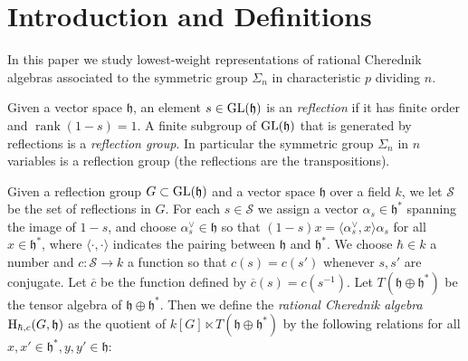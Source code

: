 \documentclass{article}
\numberwithin{equation}{section}
\newcommand{\rank}{\operatorname{rank}}
\newcommand{\h}{\mathfrak{h}}
\newcommand{\GL}{{\rm GL}}
\newcommand{\HH}{{\rm H}}
\begin{document}




\section{Introduction and Definitions}

In this paper we study lowest-weight representations of rational Cherednik algebras associated to the symmetric group $\Sigma_n$ in characteristic $p$ dividing $n$.


Given a vector space $\h$, an element $s \in \GL(\h)$ is an {\it reflection} if it has finite order and $\rank(1-s)=1$. A finite subgroup of $\GL(\h)$ that is generated by reflections is a {\it reflection group}. In particular the symmetric group $\Sigma_n$ in $n$ variables is a reflection group (the reflections are the transpositions). 

Given a reflection group $G \subset \GL(\h)$ and a vector space $\h$ over a field $k$, we let $\mathcal{S}$ be the set of reflections in $G$. For each $s \in \mathcal{S}$ we assign a vector $\alpha_s \in \h^*$ spanning the image of $1-s$, and choose $\alpha_s^\vee \in \h$ so that $(1-s)x=\langle \alpha_s^\vee,x\rangle \alpha_s$ for all $x \in \h^*$, where $\langle \cdot,\cdot\rangle$ indicates the pairing between $\h$ and $\h^*$. We choose $\hbar \in k$ a number and $c: \mathcal{S} \to k$ a function so that $c(s)=c(s')$ whenever $s,s'$ are conjugate. Let $\overline{c}$ be the function defined by $\overline{c}(s)=c(s^{-1})$. Let $T(\h \oplus \h^*)$ be the tensor algebra of $\h \oplus \h^*$. Then we define the {\it rational Cherednik algebra $\HH_{\hbar,c}(G,\h)$} as the quotient of $k[G] \ltimes T(\h \oplus \h^*)$ by the following relations for all $x,x' \in \h^*, y,y' \in \h$:
\end{document}
